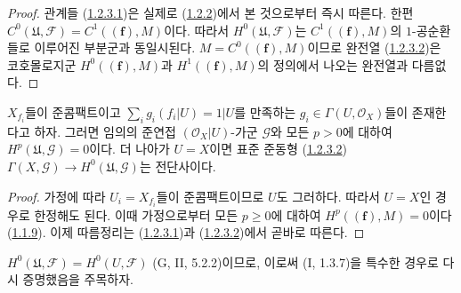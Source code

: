\begin{proof}
관계들 (\hyperref[III.1.2.3.1-fr]{1.2.3.1})은 실제로
(\hyperref[III.1.2.2-fr]{1.2.2})에서 본 것으로부터 즉시 따른다. 한편
$C^0(\mathfrak U,\mathcal F)=C^1((\mathbf f),M)$이다. 따라서
$H^0(\mathfrak U,\mathcal F)$는 $C^1((\mathbf f),M)$의 $1$-공순환들로
이루어진 부분군과 동일시된다. $M=C^0((\mathbf f),M)$이므로 완전열
(\hyperref[III.1.2.3.2-fr]{1.2.3.2})은 코호몰로지군
$H^0((\mathbf f),M)$과 $H^1((\mathbf f),M)$의 정의에서 나오는 완전열과
다름없다.
\end{proof}

\begin{corollary}[1.2.4]
\label{III.1.2.4-fr}
$X_{f_i}$들이 준콤팩트이고
$\sum_i g_i(f_i\vert U)=1\vert U$를 만족하는
$g_i\in\Gamma(U,\mathcal O_X)$들이 존재한다고 하자. 그러면 임의의
준연접 $(\mathcal O_X\vert U)$-가군 $\mathcal G$와 모든 $p>0$에 대하여
$H^p(\mathfrak U,\mathcal G)=0$이다. 더 나아가 $U=X$이면 표준 준동형
(\hyperref[III.1.2.3.2-fr]{1.2.3.2})
$\Gamma(X,\mathcal G)\to H^0(\mathfrak U,\mathcal G)$는 전단사이다.
\end{corollary}

\begin{proof}
가정에 따라 $U_i=X_{f_i}$들이 준콤팩트이므로 $U$도 그러하다. 따라서
$U=X$인 경우로 한정해도 된다. 이때 가정으로부터 모든 $p\geq0$에 대하여
$H^p((\mathbf f),M)=0$이다 (\hyperref[III.1.1.9-fr]{1.1.9}). 이제 따름정리는
(\hyperref[III.1.2.3.1-fr]{1.2.3.1})과
(\hyperref[III.1.2.3.2-fr]{1.2.3.2})에서 곧바로 따른다.
\end{proof}

$H^0(\mathfrak U,\mathcal F)=H^0(U,\mathcal F)$ (G, II, 5.2.2)이므로,
이로써 (I, 1.3.7)을 특수한 경우로 다시 증명했음을 주목하자.

